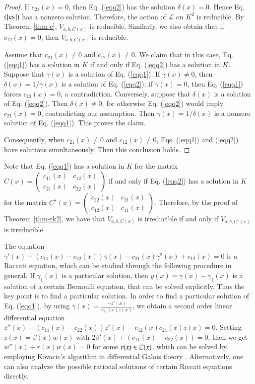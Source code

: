 \documentclass[12pt]{amsart}
\begin{document}
\begin{proof}
If $c_{21}(x)=0$, then Eq. (\ref{eqq2}) has the solution $\delta(x)=0$. Hence Eq. $(\ref{cs})$ has a nonzero solution. Therefore, the action of $\mathcal L$ on $K^2$ is reducible. By Theorem \ref{thm-c}, $V_{a,b,C(x)}$ is reducible. Similarly, we also obtain that if $c_{12}(x)=0$, then $V_{a,b,C(x)}$ is reducible.

Assume that $c_{21}(x)\neq 0$ and $c_{12}(x)\neq 0$. We claim that in this case, Eq. (\ref{eqq1}) has a solution in $K$ if and only if Eq. (\ref{eqq2}) has a solution in $K$. Suppose that $\gamma(x)$ is a solution of Eq. (\ref{eqq1}). If $\gamma(x)\neq 0$, then $\delta(x)=1/\gamma(x)$ is a solution of Eq. (\ref{eqq2}); if $\gamma(x)=0$, then Eq. (\ref{eqq1}) forces $c_{12}(x)=0$, a contradiction. Conversely, suppose that $\delta(x)$ is a solution of Eq. (\ref{eqq2}). Then $\delta(x)\neq 0$, for otherwise Eq. (\ref{eqq2}) would imply $c_{21}(x)=0$, contradicting our assumption. Then $\gamma(x)=1/\delta(x)$ is a nonzero solution of Eq. (\ref{eqq1}). This proves the claim.

Consequently, when $c_{21}(x)\neq 0$ and $c_{12}(x)\neq 0$, Eqs. (\ref{eqq1}) and (\ref{eqq2}) have solutions simultaneously. Then this conclusion holds.
\end{proof}
\begin{rmk}
Note that Eq. (\ref{eqq1}) has a solution in $K$ for the matrix $C(x)=\begin{pmatrix}
c_{11}(x)&c_{12}(x)\\
c_{21}(x)&c_{22}(x)
\end{pmatrix}$ if and only if Eq. (\ref{eqq2}) has a solution in $K$ for the matrix $C^\star(x)=\begin{pmatrix}
c_{22}(x)&c_{21}(x)\\
c_{12}(x)&c_{11}(x)
\end{pmatrix}$. Therefore, by the proof of Theorem \ref{thm-rk2}, we have that $V_{a,b,C(x)}$ is irreducible if and only if $V_{a,b,C^\star(x)}$ is irreducible.
\end{rmk}
The equation
$\gamma'(x)+(c_{11}(x)-c_{22}(x))\gamma(x)-c_{21}(x)\gamma^2(x)+c_{12}(x)=0$ is a Raccati equation, which can be studied through the following procedure in general. If $\gamma_1(x)$ is a particular solution, then $y(x)=\gamma(x)-\gamma_1(x)$ is a solution of a certain Bernoulli equation, that can be solved explicitly. Thus the key point is to find a particular solution. In order to find a particular solution of Eq. (\ref{eqq1}), by using $\gamma(x)=\frac{-z'(x)}{c_{21}(x)z(x)}$, we obtain a second order linear differential equation $z''(x)+(c_{11}(x)-c_{22}(x))z'(x)-c_{12}(x)c_{21}(x)z(x)=0$. Setting $z(x)=\beta(x) w(x)$ with $2\beta'(x)+(c_{11}(x)-c_{22}(x))=0$, then we get $w''(x)+r(x)w(x)=0$ for some $r(x)\in\mathbb{C}(x)$.  which can be solved by employing Kovacic's algorithm in differential Galois theory \cite{CH}. Alternatively, one can also analyze the possible rational solutions of certain Riccati equations directly.
\end{document}
